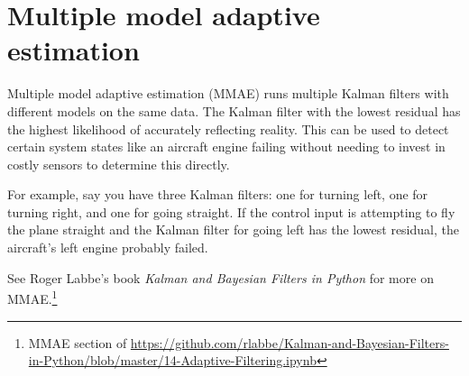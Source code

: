 \section{Multiple model adaptive estimation}

Multiple model adaptive estimation (MMAE) runs multiple Kalman filters with
different \glspl{model} on the same data. The Kalman filter with the lowest
residual has the highest likelihood of accurately reflecting reality. This can
be used to detect certain \gls{system} \glspl{state} like an aircraft engine
failing without needing to invest in costly sensors to determine this directly.

For example, say you have three Kalman filters: one for turning left, one for
turning right, and one for going straight. If the \gls{control input} is
attempting to fly the plane straight and the Kalman filter for going left has
the lowest residual, the aircraft's left engine probably failed.

See Roger Labbe's book \textit{Kalman and Bayesian Filters in Python} for more
on MMAE.\footnote{MMAE section of
\url{https://github.com/rlabbe/Kalman-and-Bayesian-Filters-in-Python/blob/master/14-Adaptive-Filtering.ipynb}}
